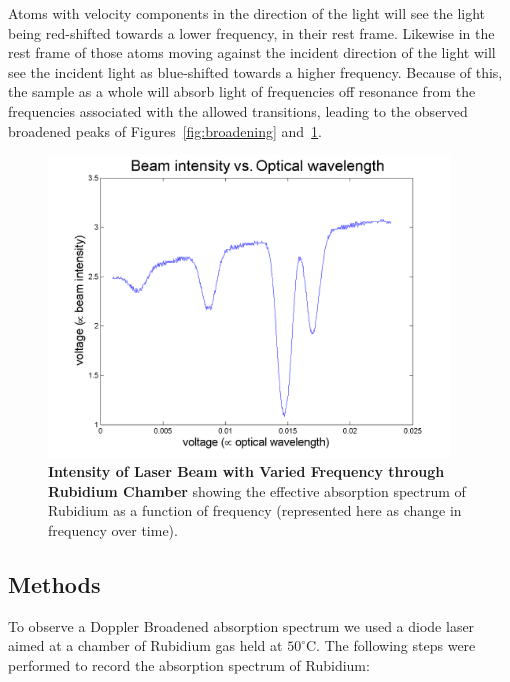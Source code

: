 \documentclass[paper=a4, fontsize=11pt]{scrartcl} %
\numberwithin{equation}{section}
\numberwithin{figure}{section}
\numberwithin{table}{section}
\begin{document}
Atoms with velocity components in the direction of the light will see the light being red-shifted towards a lower
frequency, in their rest frame. Likewise in the rest frame of those atoms moving against
the incident direction of the light will see the incident light as
blue-shifted towards a higher frequency. Because of this, the sample as
a whole will absorb light of frequencies off resonance from the
frequencies associated with the allowed transitions, leading to the observed
broadened peaks of Figures~\ref{fig:broadening} and~\ref{fig:absorb1}. 

\begin{figure}[h] \begin{center}
  \includegraphics[height=80mm]{absorb3.png}
  \caption{\textbf{Intensity of Laser Beam with Varied Frequency through Rubidium Chamber} showing the effective absorption spectrum of Rubidium as a function of frequency (represented here as change in frequency over time). }
  \label{fig:absorb1}
\end{center} \end{figure}

\subsection{Methods}
\label{sec:dop:meth}
To observe a Doppler Broadened absorption spectrum we used a diode
laser aimed at a chamber of Rubidium gas held at $50^\circ$C. The
following steps were performed to record the absorption spectrum of Rubidium:
\end{document}
